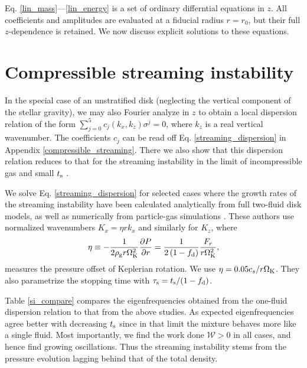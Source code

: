 
Eq. \ref{lin_mass}---\ref{lin_energy} is a set of ordinary
differntial equations in $z$. All coefficients and amplitudes are
evaluated at a fiducial radius $r=r_0$, but their full $z$-dependence
is retained. We now discuss explicit solutions to these equations. 

\section{Compressible streaming instability}\label{si}
In the special case of an unstratified disk (neglecting the vertical
component of the stellar gravity), we may also Fourier analyze in $z$
to obtain a local dispersion relation of the form  
$\sum_{j=0}^{5}c_j(k_x,k_z)\sigma^j = 0$, where $k_z$ is a real
vertical wavenumber. The coefficients $c_j$ can be read 
off Eq. \ref{streaming_dispersion} in  Appendix \ref{compressible_streaming}. 
There we also show that this dispersion relation reduces to that for
the streaming instability in the limit of incompressible gas and small
$t_\mathrm{s}$ \citep{youdin05a,jacquet11}.   

We solve Eq. \ref{streaming_dispersion} for selected cases where the  
growth rates of the streaming instability have been 
calculated analytically from full two-fluid disk models, as well as
numerically from particle-gas simulations 
\citep[namely][]{youdin07b,bai10b}. These authors use normalized
wavenumbers $K_x = \eta r k_x$ and similarly for $K_z$, where
\begin{align} 
  \eta \equiv -\frac{1}{2\rho_\mathrm{g} r\Omega_{\rm K}^2}\frac{\partial P}{\partial r} = 
  \frac{1}{2\left(1-f_\mathrm{d}\right)}\frac{F_r}{r\Omega_{\rm K}^2}, 
\end{align} 
measures the pressure offset of Keplerian rotation. We use
$\eta=0.05c_s/r\Omega_{\rm K}$. They also parametrize the stopping time with
$\tau_\mathrm{s}=t_\mathrm{s}/(1-f_\mathrm{d})$. 
 
Table \ref{si_compare} compares the eigenfrequencies obtained from the
one-fluid dispersion relation to that from the above studies. As
expected eigenfrequencies agree better with decreasing $t_\mathrm{s}$ since
in that limit the mixture behaves more like a single fluid. Most
importantly, we find the work done $\mathcal{W}>0$ in all cases, and
hence find growing oscillations. Thus the streaming instability stems
from the pressure evolution lagging behind that of the total density.  

